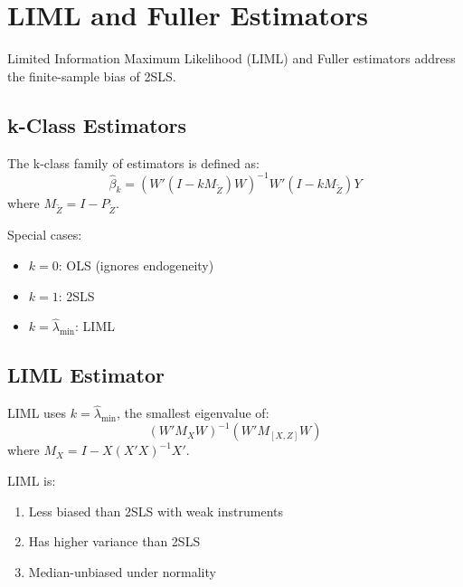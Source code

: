 \section{LIML and Fuller Estimators}
\label{sec:iv_liml}

Limited Information Maximum Likelihood (LIML) and Fuller estimators address the finite-sample bias of 2SLS.

\subsection{k-Class Estimators}

The k-class family of estimators is defined as:
\begin{equation}
\hat{\beta}_k = (W'(I - k M_{\tilde{Z}})W)^{-1} W'(I - k M_{\tilde{Z}})Y
\label{eq:kclass}
\end{equation}
where $M_{\tilde{Z}} = I - P_{\tilde{Z}}$.

Special cases:
\begin{itemize}
    \item $k = 0$: OLS (ignores endogeneity)
    \item $k = 1$: 2SLS
    \item $k = \hat{\lambda}_{\min}$: LIML
\end{itemize}

\subsection{LIML Estimator}

\begin{definition}[LIML]
\label{def:liml}
LIML uses $k = \hat{\lambda}_{\min}$, the smallest eigenvalue of:
\begin{equation}
(W'M_X W)^{-1}(W'M_{[X,Z]} W)
\end{equation}
where $M_X = I - X(X'X)^{-1}X'$.
\end{definition}

\begin{proposition}
LIML is:
\begin{enumerate}
    \item Less biased than 2SLS with weak instruments
    \item Has higher variance than 2SLS
    \item Median-unbiased under normality
\end{enumerate}
\end{proposition}

